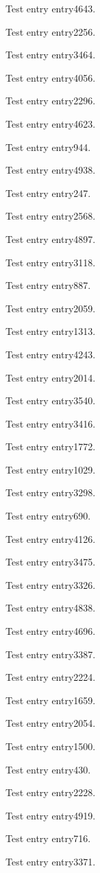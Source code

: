 Test entry \gls{entry4643}.

Test entry \gls{entry2256}.

Test entry \gls{entry3464}.

Test entry \gls{entry4056}.

Test entry \gls{entry2296}.

Test entry \gls{entry4623}.

Test entry \gls{entry944}.

Test entry \gls{entry4938}.

Test entry \gls{entry247}.

Test entry \gls{entry2568}.

Test entry \gls{entry4897}.

Test entry \gls{entry3118}.

Test entry \gls{entry887}.

Test entry \gls{entry2059}.

Test entry \gls{entry1313}.

Test entry \gls{entry4243}.

Test entry \gls{entry2014}.

Test entry \gls{entry3540}.

Test entry \gls{entry3416}.

Test entry \gls{entry1772}.

Test entry \gls{entry1029}.

Test entry \gls{entry3298}.

Test entry \gls{entry690}.

Test entry \gls{entry4126}.

Test entry \gls{entry3475}.

Test entry \gls{entry3326}.

Test entry \gls{entry4838}.

Test entry \gls{entry4696}.

Test entry \gls{entry3387}.

Test entry \gls{entry2224}.

Test entry \gls{entry1659}.

Test entry \gls{entry2054}.

Test entry \gls{entry1500}.

Test entry \gls{entry430}.

Test entry \gls{entry2228}.

Test entry \gls{entry4919}.

Test entry \gls{entry716}.

Test entry \gls{entry3371}.

